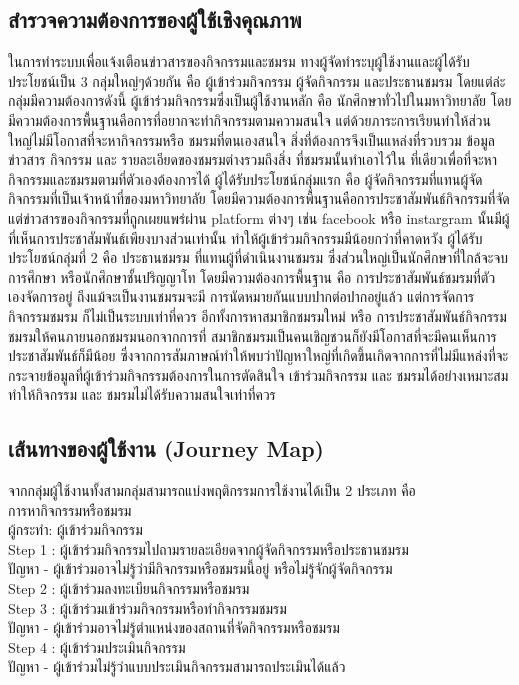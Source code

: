 \documentclass[14pt,oneside,openright,a4paper]{cpe-thai-project}
\begin{document}
\subsection{สำรวจความต้องการของผู้ใช้เชิงคุณภาพ}
  ในการทำระบบเพื่อแจ้งเตือนข่าวสารของกิจกรรมและชมรม ทางผู้จัดทำระบุผู้ใช้งานและผู้ได้รับประโยชน์เป็น 3 กลุ่มใหญ่ๆด้วยกัน คือ ผู้เข้าร่วมกิจกรรม ผู้จัดกิจกรรม และประธานชมรม โดยแต่ล่ะกลุ่มมีความต้องการดังนี้
  ผู้เข้าร่วมกิจกรรมซึ่งเป็นผู้ใช้งานหลัก คือ นักศึกษาทั่วไปในมหาวิทยาลัย โดยมีความต้องการพื้นฐานคือการที่อยากจะทำกิจกรรมตามความสนใจ แต่ด้วยภาระการเรียนทำให้ส่วนใหญ่ไม่มีโอกาสที่จะหากิจกรรมหรือ ชมรมที่ตนเองสนใจ สิ่งที่ต้องการจึงเป็นแหล่งที่รวบรวม ข้อมูลข่าวสาร กิจกรรม และ รายละเอียดของชมรมต่างรวมถึงสิ่ง ที่ชมรมนั้นทำเอาไว้ใน ที่เดียวเพื่อที่จะหากิจกรรมและชมรมตามที่ตัวเองต้องการได้
  ผู้ได้รับประโยชน์กลุ่มแรก คือ ผู้จัดกิจกรรมที่แทนผู้จัดกิจกรรมที่เป็นเจ้าหน้าที่ของมหาวิทยาลัย โดยมีความต้องการพื้นฐานคือการประชาสัมพันธ์กิจกรรมที่จัด แต่ข่าวสารของกิจกรรมที่ถูกเผยแพร่ผ่าน platform ต่างๆ เช่น facebook หรือ instargram นั้นมีผู้ที่เห็นการประชาสัมพันธ์เพียงบางส่วนเท่านั้น ทำให้ผู้เข้าร่วมกิจกรรมมีน้อยกว่าที่คาดหวัง
  ผู้ได้รับประโยชน์กลุ่มที่ 2 คือ ประธานชมรม ที่แทนผู้ที่ดำเนินงานชมรม ซึ่งส่วนใหญ่เป็นนักศึกษาที่ใกล้จะจบการศึกษา หรือนักศึกษาชั้นปริญญาโท โดยมีความต้องการพื้นฐาน คือ การประชาสัมพันธ์ชมรมที่ตัวเองจัดการอยู่ ถึงแม้จะเป็นงานชมรมจะมี การนัดหมายกันแบบปากต่อปากอยู่แล้ว แต่การจัดการกิจกรรมชมรม ก็ไม่เป็นระบบเท่าที่ควร อีกทั้งการหาสมาชิกชมรมใหม่ หรือ การประชาสัมพันธ์กิจกรรมชมรมให้คนภายนอกชมรมนอกจากการที่ สมาชิกชมรมเป็นคนเชิญชวนก็ยังมีโอกาสที่จะมีคนเห็นการประชาสัมพันธ์ก็มีน้อย
  ซึ่งจากการสัมภาษณ์ทำให้พบว่าปัญหาใหญ่ที่เกิดขึ้นเกิดจากการที่ไม่มีแหล่งที่จะกระจายข้อมูลที่ผู้เข้าร่วมกิจกรรมต้องการในการตัดสินใจ เข้าร่วมกิจกรรม และ ชมรมได้อย่างเหมาะสม ทำให้กิจกรรม และ ชมรมไม่ได้รับความสนใจเท่าที่ควร

\subsection{เส้นทางของผู้ใช้งาน (Journey Map)}
  จากกลุ่มผู้ใช้งานทั้งสามกลุ่มสามารถแบ่งพฤติกรรมการใช้งานได้เป็น 2 ประเภท คือ \\
  การหากิจกรรมหรือชมรม \\
  ผู้กระทำ: ผู้เข้าร่วมกิจกรรม \\
  Step 1 : ผู้เข้าร่วมกิจกรรมไปถามรายละเอียดจากผู้จัดกิจกรรมหรือประธานชมรม \\
  ปัญหา - ผู้เข้าร่วมอาจไม่รู้ว่ามีกิจกรรมหรือชมรมนี้อยู่ หรือไม่รู้จักผู้จัดกิจกรรม \\
  Step 2 : ผู้เข้าร่วมลงทะเบียนกิจกรรมหรือชมรม \\
  Step 3 : ผู้เข้าร่วมเข้าร่วมกิจกรรมหรือทำกิจกรรมชมรม \\
  ปัญหา - ผู้เข้าร่วมอาจไม่รู้ตำแหน่งของสถานที่จัดกิจกรรมหรือชมรม \\
  Step 4 : ผู้เข้าร่วมประเมินกิจกรรม \\
  ปัญหา - ผู้เข้าร่วมไม่รู้ว่าแบบประเมินกิจกรรมสามารถประเมินได้แล้ว \\
\end{document}
